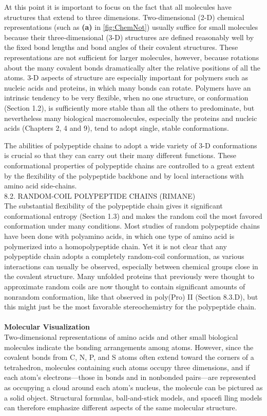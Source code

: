 At this point it is important to focus on the fact that all molecules have structures that extend to three dimensions.  Two-dimensional (2-D) chemical
representations (such as \textbf{(a)} in \ref{fig:ChemNot}) usually suffice for small molecules because their three-dimensional (3-D) structures
are defined reasonably well by the fixed bond lengths and bond angles of their covalent structures.
These representations are not sufficient for larger molecules, however, because rotations about
the many covalent bonds dramatically alter the relative positions of all the atoms. 3-D aspects of
structure are especially important for polymers such as nucleic acids and proteins, in which many
bonds can rotate. Polymers have an intrinsic tendency to be very flexible, when no one structure,
or conformation (Section 1.2), is sufficiently more stable than all the others to predominate, but
nevertheless many biological macromolecules, especially the proteins and nucleic acids (Chapters 2,
4 and 9), tend to adopt single, stable conformations.

The abilities of polypeptide chains to adopt a wide variety of 3-D conformations is crucial so that they
can carry out their many different functions. These conformational properties of polypeptide chains are controlled to a great extent by the flexibility of the polypeptide backbone and by local interactions with amino acid side-chains.
\\
8.2. RANDOM-COIL POLYPEPTIDE CHAINS (RIMANE)\\
The substantial flexibility of the polypeptide chain gives it significant conformational entropy (Section
1.3) and makes the random coil the most favored conformation under many conditions. Most studies
of random polypeptide chains have been done with polyamino acids, in which one type of amino acid
is polymerized into a homopolypeptide chain. Yet it is not clear that any polypeptide chain adopts
a completely random-coil conformation, as various interactions can usually be observed, especially
between chemical groups close in the covalent structure. Many unfolded proteins that previously were
thought to approximate random coils are now thought to contain significant amounts of nonrandom
conformation, like that observed in poly(Pro) II (Section 8.3.D), but this might just be the most
favorable stereochemistry for the polypeptide chain.
\cite{creighton2010biophysical}\\
\\
\textbf{Molecular Visualization}\\
Two-dimensional representations of amino acids and other small biological molecules indicate the bonding arrangements among atoms. However, since the covalent bonds from C, N, P, and S atoms often extend toward the corners of a tetrahedron, molecules containing such atoms occupy three dimensions, and if each atom’s electrons—those in bonds and in nonbonded pairs—are represented as occupying a cloud around each atom’s nucleus, the molecule can be pictured as a solid object. Structural formulas, ball-and-stick models, and spacefi lling models can therefore emphasize different aspects of the same molecular structure.
\cite{voet2016fundamentals}

